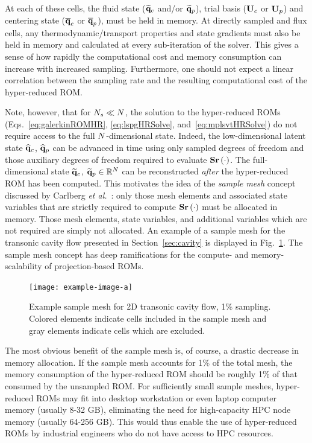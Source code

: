 At each of these cells, the fluid state ($\mathbf{\widetilde{q}}_{c}$ and/or $\mathbf{\widetilde{q}}_{p}$), trial basis ($\consTrial$ or $\primTrial$) and centering state ($\mathbf{\overline{q}}_{c}$ or $\mathbf{\overline{q}}_{p}$), must be held in memory. At directly sampled and flux cells, any thermodynamic/transport properties and state gradients must also be held in memory and calculated at every sub-iteration of the solver. This gives a sense of how rapidly the computational cost and memory consumption can increase with increased sampling. Furthermore, one should not expect a linear correlation between the sampling rate and the resulting computational cost of the hyper-reduced ROM.

Note, however, that for $N_s \ll N$, the solution to the hyper-reduced ROMs (Eqs.~\ref{eq:galerkinROMHR}, \ref{eq:lspgHRSolve}, and~\ref{eq:mplsvtHRSolve}) do not require access to the full $N$-dimensional state. Indeed, the low-dimensional latent state $\mathbf{\widehat{q}}_{c}$, $\mathbf{\widehat{q}}_{p}$ can be advanced in time using only sampled degrees of freedom and those auxiliary degrees of freedom required to evaluate $\mathbf{S} \mathbf{r}\left(\cdot\right)$. The full-dimensional state $\mathbf{\widetilde{q}}_{c}$, $\mathbf{\widetilde{q}}_{p} \in \mathbb{R}^{N}$ can be reconstructed \textit{after} the hyper-reduced ROM has been computed. This motivates the idea of the \textit{sample mesh} concept discussed by Carlberg \textit{et al.}~\cite{Carlberg2013}: only those mesh elements and associated state variables that are strictly required to compute $\mathbf{S} \mathbf{r}\left(\cdot\right)$ must be allocated in memory. Those mesh elements, state variables, and additional variables which are not required are simply not allocated. An example of a sample mesh for the transonic cavity flow presented in Section~\ref{sec:cavity} is displayed in Fig.~\ref{fig:sampMeshExample}. The sample mesh concept has deep ramifications for the compute- and memory-scalability of projection-based ROMs.

\begin{figure}
	\centering
	\texttt{[image: example-image-a]}
	\caption{\label{fig:sampMeshExample}Example sample mesh for 2D transonic cavity flow, 1\% sampling. Colored elements indicate cells included in the sample mesh and gray elements indicate cells which are excluded.}
\end{figure}

The most obvious benefit of the sample mesh is, of course, a drastic decrease in memory allocation. If the sample mesh accounts for 1\% of the total mesh, the memory consumption of the hyper-reduced ROM should be roughly 1\% of that consumed by the unsampled ROM. For sufficiently small sample meshes, hyper-reduced ROMs may fit into desktop workstation or even laptop computer memory (usually 8-32 GB), eliminating the need for high-capacity HPC node memory (usually 64-256 GB). This would thus enable the use of hyper-reduced ROMs by industrial engineers who do not have access to HPC resources.

